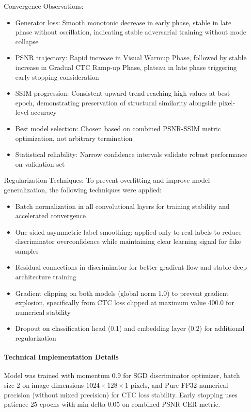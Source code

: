 \documentclass[journal]{IEEEtran}
\begin{document}
Convergence Observations:
\begin{itemize}
    \item Generator loss: Smooth monotonic decrease in early phase, stable in late phase without oscillation, indicating stable adversarial training without mode collapse
    \item PSNR trajectory: Rapid increase in Visual Warmup Phase, followed by stable increase in Gradual CTC Ramp-up Phase, plateau in late phase triggering early stopping consideration
    \item SSIM progression: Consistent upward trend reaching high values at best epoch, demonstrating preservation of structural similarity alongside pixel-level accuracy
    \item Best model selection: Chosen based on combined PSNR-SSIM metric optimization, not arbitrary termination
    \item Statistical reliability: Narrow confidence intervals validate robust performance on validation set
\end{itemize}

Regularization Techniques: To prevent overfitting and improve model generalization, the following techniques were applied:

\begin{itemize}
    \item Batch normalization in all convolutional layers for training stability and accelerated convergence
    \item One-sided asymmetric label smoothing: applied only to real labels to reduce discriminator overconfidence while maintaining clear learning signal for fake samples
    \item Residual connections in discriminator for better gradient flow and stable deep architecture training
    \item Gradient clipping on both models (global norm 1.0) to prevent gradient explosion, specifically from CTC loss clipped at maximum value 400.0 for numerical stability
    \item Dropout on classification head (0.1) and embedding layer (0.2) for additional regularization
\end{itemize}

\paragraph{Technical Implementation Details} Model was trained with momentum 0.9 for SGD discriminator optimizer, batch size 2 on image dimensions $1024 \times 128 \times 1$ pixels, and Pure FP32 numerical precision (without mixed precision) for CTC loss stability. Early stopping uses patience 25 epochs with min delta 0.05 on combined PSNR-CER metric.
\end{document}
